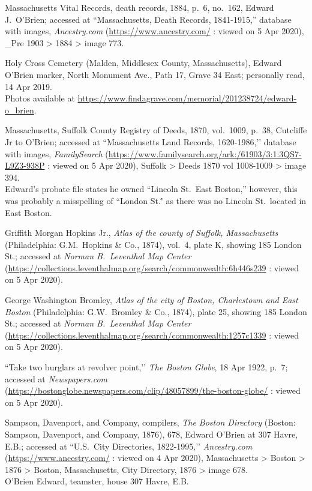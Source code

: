 \begin{thebibliography}{999}
	Massachusetts Vital Records, death records, 1884, p.\ 6, no.\ 162, Edward J.\ O'Brien; accessed at ``Massachusetts, Death Records, 1841-1915,'' database with images, \textit{Ancestry.com} (\url{https://www.ancestry.com/} : viewed on 5 Apr 2020), \_Pre 1903 > 1884 > image 773.	
	
	Holy Cross Cemetery (Malden, Middlesex County, Massachusetts), Edward O'Brien marker, North Monument Ave., Path 17, Grave 34 East; personally read, 14 Apr 2019. \\
	Photos available at \url{https://www.findagrave.com/memorial/201238724/edward-o_brien}.

	Massachusetts, Suffolk County Registry of Deeds, 1870, vol.\ 1009, p.\ 38, Cutcliffe Jr to O’Brien; accessed at ``Massachusetts Land Records, 1620-1986,’’ database with images, \textit{FamilySearch} (\url{https://www.familysearch.org/ark:/61903/3:1:3QS7-L9Z3-938P} : viewed on 5 Apr 2020), Suffolk > Deeds 1870 vol 1008-1009 > image 394.\\
	Edward's probate file states he owned ``Lincoln St.\  East Boston,'' however, this was probably a misspelling of ``London St.\'' as there was no Lincoln St.\ located in East Boston.\cite{EastBostonStreets}
	
	Griffith Morgan Hopkins Jr., \textit{Atlas of the county of Suffolk, Massachusetts} (Philadelphia: G.M.\ Hopkins \& Co., 1874), vol.\ 4, plate K, showing 185 London St.; accessed at \textit{Norman B.\ Leventhal Map Center} (\url{https://collections.leventhalmap.org/search/commonwealth:6h446s239} : viewed on 5 Apr 2020).
	
	George Washington Bromley, \textit{Atlas of the city of Boston, Charlestown and East Boston} (Philadelphia: G.W.\ Bromley \& Co., 1874), plate 25, showing 185 London St.; accessed at \textit{Norman B.\ Leventhal Map Center} (\url{https://collections.leventhalmap.org/search/commonwealth:1257c1339} : viewed on 5 Apr 2020).
	
	``Take two burglars at revolver point,’’ \textit{The Boston Globe}, 18 Apr 1922, p.\ 7; accessed at \textit{Newspapers.com} (\url{https://bostonglobe.newspapers.com/clip/48057899/the-boston-globe/} : viewed on 5 Apr 2020).
	
	Sampson, Davenport, and Company, compilers, \textit{The Boston Directory} (Boston: Sampson, Davenport, and Company, 1876), 678, Edward O’Brien at 307 Havre, E.B.; accessed at ``U.S.\ City Directories, 1822-1995,’’ \textit{Ancestry.com} (\url{https://www.ancestry.com/} : viewed on 4 Apr 2020), Massachusetts > Boston > 1876 > Boston, Massachusetts, City Directory, 1876 > image 678.\\
	O’Brien Edward, teamster, house 307 Havre, E.B.
	

\end{thebibliography}
